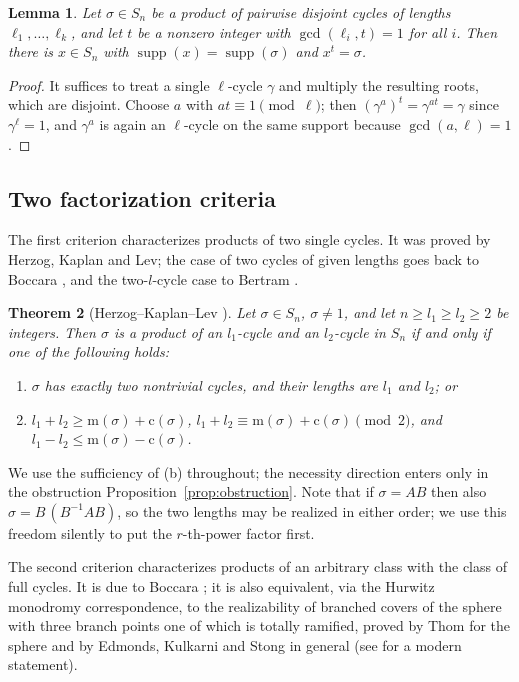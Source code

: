 \documentclass[11pt]{amsart}
\numberwithin{equation}{section}
\newtheorem{theorem}{Theorem}[section]
\newtheorem{lemma}[theorem]{Lemma}
\theoremstyle{remark}
\newcommand{\supp}{\operatorname{supp}}
\newcommand{\md}{\mathrm{m}}   %
\newcommand{\cy}{\mathrm{c}}   %
\begin{document}
\begin{lemma}\label{lem:root}
Let $\sigma\in S_n$ be a product of pairwise disjoint cycles of lengths
$\ell_1,\dots,\ell_k$, and let $t$ be a nonzero integer with $\gcd(\ell_i,t)=1$
for all $i$. Then there is $x\in S_n$ with $\supp(x)=\supp(\sigma)$ and
$x^t=\sigma$.
\end{lemma}

\begin{proof}
It suffices to treat a single $\ell$-cycle $\gamma$ and multiply the resulting
roots, which are disjoint. Choose $a$ with $at\equiv 1\pmod{\ell}$; then
$(\gamma^a)^t=\gamma^{at}=\gamma$ since $\gamma^\ell=1$, and $\gamma^a$ is again an
$\ell$-cycle on the same support because $\gcd(a,\ell)=1$.
\end{proof}

\subsection{Two factorization criteria}
The first criterion characterizes products of two single cycles. It was proved by
Herzog, Kaplan and Lev; the case of two cycles of given lengths goes back to
Boccara \cite{Boccara80}, and the two-$l$-cycle case to Bertram \cite{Bertram}.

\begin{theorem}[Herzog--Kaplan--Lev {\cite[Theorem~7]{HKL}}]\label{thm:HKL}
Let $\sigma\in S_n$, $\sigma\neq 1$, and let $n\ge l_1\ge l_2\ge 2$ be integers.
Then $\sigma$ is a product of an $l_1$-cycle and an $l_2$-cycle in $S_n$ if and
only if one of the following holds:
\begin{enumerate}
\item[(a)] $\sigma$ has exactly two nontrivial cycles, and their lengths are $l_1$
and $l_2$; or
\item[(b)] $l_1+l_2\ge \md(\sigma)+\cy(\sigma)$, \quad
$l_1+l_2\equiv \md(\sigma)+\cy(\sigma) \pmod 2$, \quad and \quad
$l_1-l_2\le \md(\sigma)-\cy(\sigma)$.
\end{enumerate}
\end{theorem}

We use the sufficiency of (b) throughout; the necessity direction enters only in
the obstruction Proposition~\ref{prop:obstruction}. Note that if $\sigma=AB$ then
also $\sigma=B\,(B^{-1}AB)$, so the two lengths may be realized in either order; we
use this freedom silently to put the $r$-th-power factor first.

The second criterion characterizes products of an arbitrary class with the class
of full cycles. It is due to Boccara \cite{Boccara82}; it is also equivalent, via
the Hurwitz monodromy correspondence, to the realizability of branched covers of
the sphere with three branch points one of which is totally ramified, proved by
Thom for the sphere and by Edmonds, Kulkarni and Stong in general \cite{Thom,EKS}
(see \cite[Theorem~2.1]{Petronio} for a modern statement).
\end{document}
